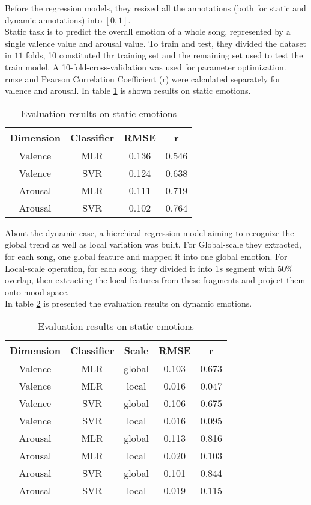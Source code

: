Before the regression models, they resized all the annotations (both for static and dynamic annotations) into $[0,1]$.
\\ \indent
Static task is to predict the overall emotion of a whole song, represented by a single valence value and arousal value. To train and test, they divided the dataset in $11$ folds, 10 constituted thr training set and the remaining set used to test the train model. A 10-fold-cross-validation was used for parameter optimization.
\\
\gls{rmse} and Pearson Correlation Coefficient (r) were calculated separately for valence and arousal. In table \ref{table:PMEmo_results_static} is shown results on static emotions.
\begin{table}[h!]
	\centering
	\begin{tabular}{|c|c|c|c|}
		\hline
		Dimension & Classifier & RMSE & r \\ [0.5ex] 
		\hline\hline Valence & MLR & 0.136 & 0.546 \\ 
		\hline Valence & SVR & 0.124 & 0.638 \\
		\hline Arousal & MLR & 0.111 & 0.719 \\
		\hline Arousal & SVR & 0.102 & 0.764 \\
		\hline
	\end{tabular}
	\caption{Evaluation results on static emotions}
	\label{table:PMEmo_results_static}
\end{table}
\indent About the dynamic case, a hierchical regression model aiming to recognize the global trend as well as local variation was built. For Global-scale they extracted, for each song, one global feature and mapped it into one global emotion. For Local-scale operation, for each song, they divided it into $1s$ segment with $50\%$ overlap, then extracting the local features from these fragments and project them onto mood space.
\\
In table \ref{table:PMEmo_results_dynamic} is presented the evaluation results on dynamic emotions.
\begin{table}[h!]
	\centering
	\begin{tabular}{|c|c|c|c|c|}
		\hline
		Dimension & Classifier & Scale & RMSE & r \\ [0.5ex] 
		\hline\hline Valence & MLR & global & 0.103 & 0.673 \\
		\hline Valence & MLR & local & 0.016 & 0.047 \\
		\hline Valence & SVR & global & 0.106 & 0.675 \\
		\hline Valence & SVR & local & 0.016 & 0.095 \\
		\hline Arousal & MLR & global & 0.113 & 0.816 \\
		\hline Arousal & MLR & local & 0.020 & 0.103 \\
		\hline Arousal & SVR & global & 0.101 & 0.844 \\
		\hline Arousal & SVR & local & 0.019 & 0.115 \\
		\hline
	\end{tabular}
	\caption{Evaluation results on static emotions}
	\label{table:PMEmo_results_dynamic}
\end{table}
